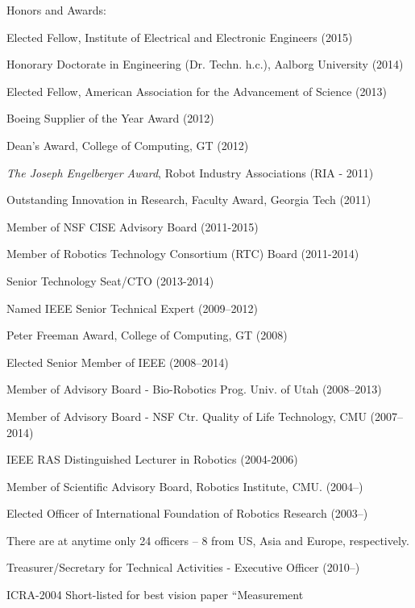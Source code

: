 \documentclass{article}
\newenvironment{sublist}{%
  \begin{list}{}{%
      \setlength{\itemsep}{0em}\setlength{\parsep}{0em}%
      \setlength{\topsep}{0em}\setlength{\parskip}{0em}%
    }%
}%
{ \end{list} }
\begin{document}
\begin{cv}
\begin{cvlist}{Honors and Awards:}
\item Elected Fellow, Institute of Electrical and Electronic Engineers (2015)
\item Honorary Doctorate in Engineering (Dr. Techn. h.c.), Aalborg University (2014)
\item Elected Fellow, American Association for the Advancement of Science (2013)
\item Boeing Supplier of the Year Award (2012)
\item Dean's Award, College of Computing, GT (2012)
\item {\em The Joseph Engelberger Award}, Robot Industry Associations (RIA - 2011)
\item Outstanding Innovation in Research, Faculty Award, Georgia Tech (2011)
\item Member of NSF CISE Advisory Board (2011-2015)
\item Member of Robotics Technology Consortium (RTC) Board (2011-2014)
  \begin{sublist}
  \item Senior Technology Seat/CTO (2013-2014)
  \end{sublist}
\item Named IEEE Senior Technical Expert (2009--2012)
\item Peter Freeman Award, College of Computing, GT (2008)
\item Elected Senior Member of IEEE (2008--2014)
\item Member of Advisory Board - Bio-Robotics Prog. Univ. of Utah (2008--2013)
\item Member of Advisory Board - NSF Ctr. Quality of Life Technology,
  CMU (2007--2014)
\item IEEE RAS Distinguished Lecturer in Robotics (2004-2006)
\item Member of Scientific Advisory Board, Robotics Institute, CMU.  (2004--)
\item Elected Officer of International Foundation of Robotics Research
  (2003--)
  \begin{sublist}
  \item There are at anytime only 24 officers -- 8 from US, Asia and Europe,
    respectively.
  \item Treasurer/Secretary for Technical Activities - Executive Officer (2010--)
  \end{sublist}
\item ICRA-2004 Short-listed for best vision paper ``Measurement

\end{cvlist}
\end{cv}
\end{document}
